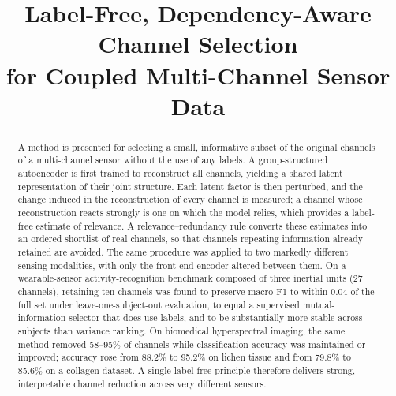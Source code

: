 \documentclass[conference]{IEEEtran}
\begin{document}
\title{Label-Free, Dependency-Aware Channel Selection\\
for Coupled Multi-Channel Sensor Data}

\author{
\and
{}
\and
{}
}

\maketitle

\begin{abstract}
A method is presented for selecting a small, informative subset of the original
channels of a multi-channel sensor without the use of any labels. A
group-structured autoencoder is first trained to reconstruct all channels,
yielding a shared latent representation of their joint structure. Each latent
factor is then perturbed, and the change induced in the reconstruction of every
channel is measured; a channel whose reconstruction reacts strongly is one on
which the model relies, which provides a label-free estimate of relevance. A
relevance--redundancy rule converts these estimates into an ordered shortlist of
real channels, so that channels repeating information already retained are
avoided. The same procedure was applied to two markedly different sensing
modalities, with only the front-end encoder altered between them. On a
wearable-sensor activity-recognition benchmark composed of three inertial units
(27 channels), retaining ten channels was found to preserve macro-F1 to within
0.04 of the full set under leave-one-subject-out evaluation, to equal a
supervised mutual-information selector that does use labels, and to be
substantially more stable across subjects than variance ranking. On biomedical
hyperspectral imaging, the same method removed 58--95\% of channels while
classification accuracy was maintained or improved; accuracy rose from 88.2\% to
95.2\% on lichen tissue and from 79.8\% to 85.6\% on a collagen dataset. A single
label-free principle therefore delivers strong, interpretable channel reduction
across very different sensors.
\end{abstract}
\end{document}
